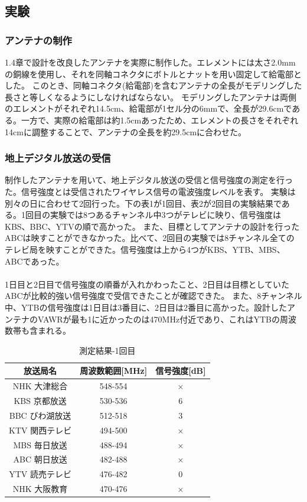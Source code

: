 \documentclass[dvipdfmx,autodetect-engine,titlepage]{jsarticle}
\begin{document}
\subsection{実験}
\subsubsection{アンテナの制作}
1.4章で設計を改良したアンテナを実際に制作した。エレメントには太さ2.0mmの銅線を使用し、それを同軸コネクタにボトルとナットを用い固定して給電部とした。
このとき、同軸コネクタ(給電部)を含むアンテナの全長がモデリングした長さと等しくなるようにしなければならない。
モデリングしたアンテナは両側のエレメントがそれぞれ14.5cm、給電部が1セル分の6mmで、全長が29.6cmである。一方で、実際の給電部は約1.5cmあったため、エレメントの長さをそれぞれ14cmに調整することで、アンテナの全長を約29.5cmに合わせた。\\

\subsubsection{地上デジタル放送の受信}
制作したアンテナを用いて、地上デジタル放送の受信と信号強度の測定を行った。信号強度とは受信されたワイヤレス信号の電波強度レベルを表す。
実験は別々の日に合わせて2回行った。下の表1が1回目、表2が2回目の実験結果である。1回目の実験では8つあるチャンネル中3つがテレビに映り、信号強度はKBS、BBC、YTVの順で高かった。
また、目標としてアンテナの設計を行ったABCは映すことができなかった。比べて、2回目の実験では8チャンネル全てのテレビ局を映すことができた。信号強度は上から4つがKBS、YTB、MBS、ABCであった。\\\\
1日目と2日目で信号強度の順番が入れかわったこと、2日目は目標としていたABCが比較的強い信号強度で受信できたことが確認できた。
また、8チャンネル中、YTBの信号強度は1日目は3番目に、2日目は2番目に高かった。設計したアンテナのVAWRが最も1に近かったのは470MHz付近であり、これはYTBの周波数帯も含まれる。\\

  \begin{table}[H]
    \centering
    \caption{測定結果-1回目}\label{fig:表1}
    \begin{tabular}{|c|c|c|}
    \hline
    放送局名       & 周波数範囲{[}MHz{]} & 信号強度{[}dB{]} \\ \hline
    NHK 大津総合   & 548-554        & ×            \\ \hline
    KBS 京都放送   & 530-536        & 6            \\ \hline
    BBC  びわ湖放送 & 512-518        & 3            \\ \hline
    KTV 関西テレビ  & 494-500        & ×            \\ \hline
    MBS 毎日放送   & 488-494        & ×            \\ \hline
    ABC 朝日放送   & 482-488        & ×            \\ \hline
    YTV 読売テレビ  & 476-482        & 0            \\ \hline
    NHK 大阪教育   & 470-476        & ×            \\ \hline
    \end{tabular}
    \end{table}
\end{document}
